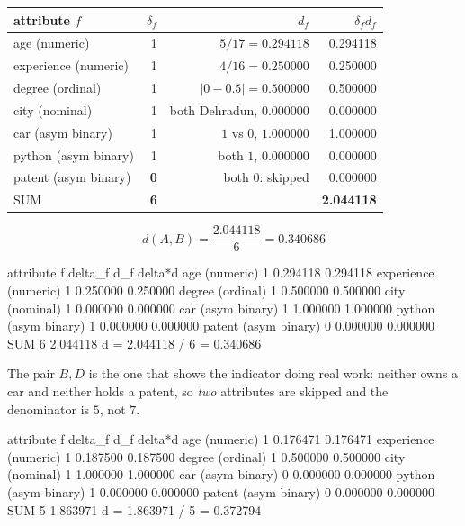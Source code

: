 \documentclass[11pt]{article}
\begin{document}
\begin{worked}
\begin{center}
\begin{tabular}{lrrr}
  \toprule
  attribute $f$ & $\delta_f$ & $d_f$ & $\delta_f d_f$ \\
  \midrule
  age (numeric) & 1 & $5/17 = 0.294118$ & 0.294118 \\
  experience (numeric) & 1 & $4/16 = 0.250000$ & 0.250000 \\
  degree (ordinal) & 1 & $|0 - 0.5| = 0.500000$ & 0.500000 \\
  city (nominal) & 1 & both Dehradun, $0.000000$ & 0.000000 \\
  car (asym binary) & 1 & $1$ vs $0$, $1.000000$ & 1.000000 \\
  python (asym binary) & 1 & both $1$, $0.000000$ & 0.000000 \\
  patent (asym binary) & \textbf{0} & both $0$: skipped & 0.000000 \\
  \midrule
  SUM & \textbf{6} & & \textbf{2.044118} \\
  \bottomrule
\end{tabular}
\end{center}
\[
  d(A,B) = \frac{2.044118}{6} = \mathbf{0.340686}
\]
\end{worked}

\begin{codeout}
attribute f            delta_f        d_f      delta*d
age (numeric)                1   0.294118     0.294118
experience (numeric)         1   0.250000     0.250000
degree (ordinal)             1   0.500000     0.500000
city (nominal)               1   0.000000     0.000000
car (asym binary)            1   1.000000     1.000000
python (asym binary)         1   0.000000     0.000000
patent (asym binary)         0   0.000000     0.000000
SUM                          6                2.044118
d = 2.044118 / 6 = 0.340686
\end{codeout}

The pair $B,D$ is the one that shows the indicator doing real work: neither
owns a car and neither holds a patent, so \emph{two} attributes are skipped
and the denominator is $5$, not $7$.

\begin{codeout}
attribute f            delta_f        d_f      delta*d
age (numeric)                1   0.176471     0.176471
experience (numeric)         1   0.187500     0.187500
degree (ordinal)             1   0.500000     0.500000
city (nominal)               1   1.000000     1.000000
car (asym binary)            0   0.000000     0.000000
python (asym binary)         1   0.000000     0.000000
patent (asym binary)         0   0.000000     0.000000
SUM                          5                1.863971
d = 1.863971 / 5 = 0.372794
\end{codeout}
\end{document}
